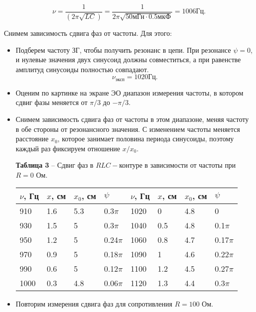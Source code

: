 \documentclass[12pt,a4paper]{article}
\begin{document}
        \[
        \nu = \frac{1}{(2 \pi \sqrt{LC})} = \frac{1}{2 \pi \sqrt{50\text{мГн} \cdot 0.5 \text{мкФ}}} = 1006 \text{Гц}.
        \]
        
        Снимем зависимость сдвига фаз от частоты. Для этого:
        \begin{itemize}
            \item Подберем частоту ЗГ, чтобы получить резонанс в цепи. При резонансе $\psi = 0$, и нулевые значения двух синусоид должны совместиться, а при равенстве амплитуд синусоиды полностью совпадают.
            \[
            \nu_{\text{эксп}} = 1020 \text{Гц}.
            \]
            \item Оценим по картинке на экране ЭО диапазон измерения частоты, в котором сдвиг фазы меняется от $\pi/3$ до $-\pi/3$.
            \item Снимем зависимость сдвига фаз от частоты в этом диапазоне, меняя частоту в обе стороны от резонансного значения. С изменением частоты меняется расстояние $x_0$, которое занимает половина периода синусоиды, поэтому каждый раз фиксируем отношение $x/x_0$.
            
            \begin{table}[!h]
            \begin{flushleft}%
           		\textbf{Таблица 3} -- Сдвиг фаз в $RLC-$контуре в зависимости от частоты при $R = 0$ Ом.\\
            \end{flushleft}
                \begin{center}
                    \begin{tabular}{ | l | l | l | l | l | l | l | l |}
                        \hline
                        $\nu$, Гц   &   $x$, см &  $x_0$, см&   $\psi$  &   $\nu$, Гц   &   $x$, см &  $x_0$, см&   $\psi$  \\
                        \hline
                        910     &   1.6 &   5.3 &   0.3$\pi$    &   1020    &   0   &   4.8 &   0           \\
                        930     &   1.5 &   5   &   0.3$\pi$    &   1040    &   0.5 &   4.8 &   0.1$\pi$    \\
                        950     &   1.2 &   5   &   0.24$\pi$   &   1060    &   0.8 &   4.7 &   0.17$\pi$   \\
                        970     &   0.9 &   5   &   0.18$\pi$   &   1090    &   1   &   4.6 &   0.22$\pi$   \\
                        990     &   0.6 &   5   &   0.12$\pi$   &   1100    &   1.2 &   4.5 &   0.27$\pi$   \\
                        1000    &   0.3 &   4.8 &   0.06$\pi$   &   1120    &   1.3 &   4.4 &   0.3$\pi$    \\
                        \hline         
                    \end{tabular}
                \end{center}
            \end{table}   
            \item Повторим измерения сдвига фаз для сопротивления $R = 100$ Ом.
            

\end{itemize}
\end{document}
